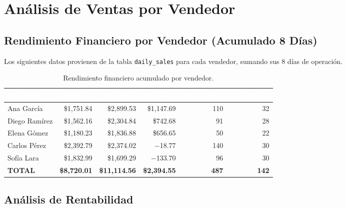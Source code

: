 \documentclass[12pt,letterpaper]{article}
\begin{document}
\newpage
\section{Análisis de Ventas por Vendedor}

\subsection{Rendimiento Financiero por Vendedor (Acumulado 8 Días)}

Los siguientes datos provienen de la tabla \texttt{daily\_sales} para cada vendedor, sumando sus 8 días de operación.

\begin{table}[H]
\centering
\footnotesize
{}
\begin{tabular}{l r r r r r}
\toprule
\rowcolor{tabheader}
\textcolor{white}{\textbf{Vendedor}} &
\textcolor{white}{\textbf{Inversión}} &
\textcolor{white}{\textbf{Ingresos}} &
\textcolor{white}{\textbf{Ganancia}} &
\textcolor{white}{\textbf{Uds.\ Vend.}} &
\textcolor{white}{\textbf{Uds.\ Perd.}} \\
\midrule
Ana García      & \$1,751.84 & \$2,899.53 & \$1,147.69 & 110 & 32 \\
Diego Ramírez   & \$1,562.16 & \$2,304.84 & \$742.68   &  91 & 28 \\
Elena Gómez     & \$1,180.23 & \$1,836.88 & \$656.65   &  50 & 22 \\
Carlos Pérez    & \$2,392.79 & \$2,374.02 & $-$18.77   & 140 & 30 \\
Sofía Lara      & \$1,832.99 & \$1,699.29 & $-$133.70  &  96 & 30 \\
\midrule
\textbf{TOTAL}  & \textbf{\$8,720.01} & \textbf{\$11,114.56} & \textbf{\$2,394.55} & \textbf{487} & \textbf{142} \\
\bottomrule
\end{tabular}
\caption{Rendimiento financiero acumulado por vendedor.}
\end{table}

\subsection{Análisis de Rentabilidad}
\end{document}
